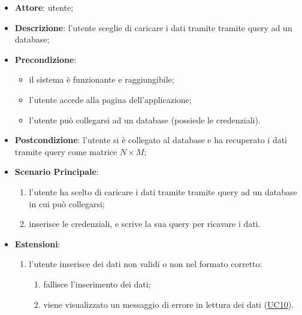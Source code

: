     \begin{itemize}
    \item \textbf{Attore}: utente;
    \item \textbf{Descrizione}: l'utente sceglie di caricare i dati tramite tramite query ad un database;
    \item \textbf{Precondizione}:
    \begin{itemize}
        \item il sistema è funzionante e raggiungibile;
        \item l'utente accede alla pagina dell'applicazione;
        \item l'utente può collegarsi ad un database (possiede le credenziali).
    \end{itemize}
    \item \textbf{Postcondizione}: l'utente si è collegato al database e ha recuperato i dati tramite query come matrice $N\times M$;
    \item \textbf{Scenario Principale}: 
        \begin{enumerate}
            \item l'utente ha scelto di caricare i dati tramite tramite query ad un database in cui può collegarsi;
            \item inserisce le credenziali, e scrive la sua query per ricavare i dati.
        \end{enumerate}
        \item \textbf{Estensioni}:
        \begin{enumerate}
            \item l'utente inserisce dei dati non validi o non nel formato corretto:
                \begin{enumerate}
                    \item fallisce l'inserimento dei dati;
                    \item viene visualizzato un messaggio di errore in lettura dei dati (\hyperref[uc10]{UC10}).
                \end{enumerate}
        \end{enumerate}  
    \end{itemize}

    
